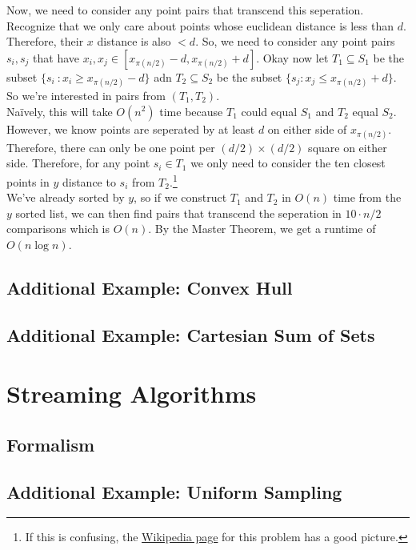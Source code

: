 \documentclass[11pt]{article}
\theoremstyle{plain}
\theoremstyle{definition}
\numberwithin{equation}{section}
\numberwithin{figure}{section}
\begin{document}
\noindent Now, we need to consider any point pairs that transcend this seperation. Recognize that we only care about points whose euclidean distance is less than $d$. Therefore, their $x$ distance is also $< d$. So, we need to consider any point pairs $s_i, s_j$ that have $x_i, x_j \in [x_{\pi(n/2)}-d, x_{\pi(n/2)}+d]$. Okay now let $T_1 \subseteq S_1$ be the subset $\{s_i \ : x_i \geq x_{\pi(n/2)}-d\}$ adn $T_2 \subseteq S_2$ be the subset $\{s_j : x_j \leq x_{\pi(n/2)} + d\}$. So we're interested in pairs from $(T_1, T_2)$. \\

\noindent Na\"ively, this will take $O(n^2)$ time because $T_1$ could equal $S_1$ and $T_2$ equal $S_2$. However, we know points are seperated by at least $d$ on either side of $x_{\pi(n/2)}$. Therefore, there can only be one point per $(d/2) \times (d/2)$ square on either side. Therefore, for any point $s_i \in T_1$ we only need to consider the ten closest points in $y$ distance to $s_i$ from $T_2$.\footnote{If this is confusing, the \href{https://en.wikipedia.org/wiki/Closest_pair_of_points_problem}{Wikipedia page} for this problem has a good picture.} \\

\noindent We've already sorted by $y$, so if we construct $T_1$ and $T_2$ in $O(n)$ time from the $y$ sorted list, we can then find pairs that transcend the seperation in $10 \cdot n/2$ comparisons which is $O(n)$. By the Master Theorem, we get a runtime of $O(n \log n)$.

\subsection{Additional Example: Convex Hull}

\subsection{Additional Example: Cartesian Sum of Sets}

\newpage
\section{Streaming Algorithms}

\subsection{Formalism}

\subsection{Additional Example: Uniform Sampling}
\end{document}
